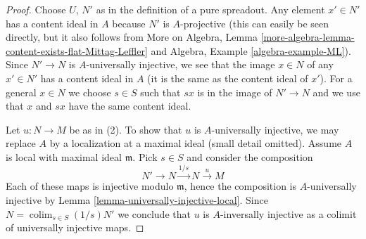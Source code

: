 \documentclass[10pt,a4paper]{amsart}
\theoremstyle{plain}
\theoremstyle{definition}
\theoremstyle{remark}
\numberwithin{equation}{subsection}
\def\colim{\mathop{\mathrm{colim}}\nolimits}
\begin{document}
\begin{proof}
Choose $U$, $N'$ as in the definition of a pure spreadout.
Any element $x' \in N'$ has a content ideal in $A$ because
$N'$ is $A$-projective (this can easily be seen directly, but
it also follows from More on Algebra, Lemma
\ref{more-algebra-lemma-content-exists-flat-Mittag-Leffler} and
Algebra, Example \ref{algebra-example-ML}).
Since $N' \to N$ is $A$-universally injective, we see that
the image $x \in N$ of any $x' \in N'$ has a content ideal in $A$
(it is the same as the content ideal of $x'$).
For a general $x \in N$ we choose $s \in S$ such that
$s x$ is in the image of $N' \to N$ and we use that $x$ and $sx$
have the same content ideal.

\medskip\noindent
Let $u : N \to M$ be as in (2). To show that $u$ is $A$-universally
injective, we may replace $A$ by a localization at a maximal ideal
(small detail omitted). Assume $A$ is local with maximal ideal $\mathfrak m$.
Pick $s \in S$ and consider the composition
$$
N' \to N \xrightarrow{1/s} N \xrightarrow{u} M
$$
Each of these maps is injective modulo $\mathfrak m$, hence the composition
is $A$-universally injective by
Lemma \ref{lemma-universally-injective-local}.
Since $N = \colim_{s \in S} (1/s)N'$ we conclude that $u$
is $A$-inversally injective as a colimit of universally injective maps.
\end{proof}
\end{document}
